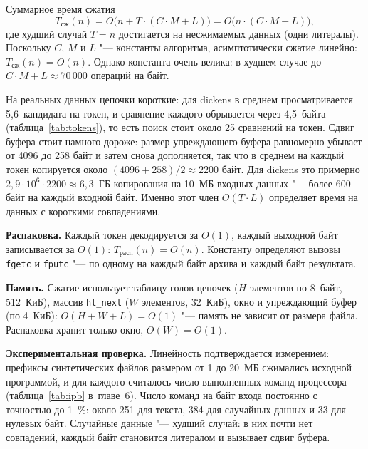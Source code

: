 Суммарное время сжатия
\begin{equation}
\label{eq:base-compress}
T_{\text{сж}}(n) = O\bigl(n + T \cdot (C \cdot M + L)\bigr) =
O\bigl(n \cdot (C \cdot M + L)\bigr),
\end{equation}
где худший случай $T = n$ достигается на несжимаемых данных (одни
литералы). Поскольку $C$, $M$ и $L$ "--- константы алгоритма, асимптотически
сжатие линейно: $T_{\text{сж}}(n) = O(n)$. Однако константа очень велика:
в худшем случае до $C\cdot M + L \approx 70\,000$ операций на байт.

На реальных данных цепочки короткие: для dickens в среднем просматривается
5,6~кандидата на токен, и сравнение каждого обрывается через 4,5~байта
(таблица~\ref{tab:tokens}), то есть поиск стоит около 25 сравнений на токен.
Сдвиг буфера стоит намного дороже: размер упреждающего буфера равномерно
убывает от 4096 до 258 байт и затем снова дополняется, так что в среднем
на каждый токен копируется около $(4096 + 258)/2 \approx 2200$ байт. Для
dickens это примерно $2{,}9\cdot10^6 \cdot 2200 \approx 6{,}3$~ГБ копирования
на 10~МБ входных данных "--- более 600 байт на каждый входной байт.
Именно этот член $O(T\cdot L)$ определяет время на данных с короткими
совпадениями.

\textbf{Распаковка.} Каждый токен декодируется за $O(1)$, каждый выходной
байт записывается за $O(1)$: $T_{\text{расп}}(n) = O(n)$. Константу
определяют вызовы \texttt{fgetc} и \texttt{fputc} "--- по одному на каждый
байт архива и каждый байт результата.

\textbf{Память.} Сжатие использует таблицу голов цепочек ($H$ элементов
по 8~байт, 512~КиБ), массив \texttt{ht\_next} ($W$ элементов, 32~КиБ), окно
и упреждающий буфер (по 4~КиБ): $O(H + W + L) = O(1)$ "--- память не
зависит от размера файла. Распаковка хранит только окно, $O(W) = O(1)$.

\textbf{Экспериментальная проверка.} Линейность подтверждается
измерением: префиксы синтетических файлов размером от 1 до 20~МБ сжимались
исходной программой, и для каждого считалось число выполненных команд
процессора (таблица~\ref{tab:ipb} в~главе~6). Число команд на байт входа
постоянно с точностью до 1~\%: около 251 для текста, 384 для случайных
данных и 33 для нулевых байт. Случайные данные "--- худший случай: в них
почти нет совпадений, каждый байт становится литералом и вызывает сдвиг
буфера.
